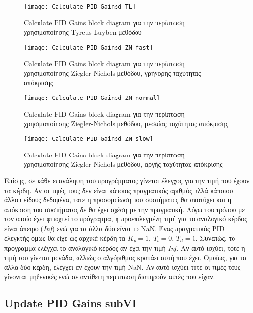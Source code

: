 \begin{figure}[h]
  \centering
  \texttt{[image: Calculate\_PID\_Gainsd\_TL]}
  \caption{Calculate PID Gains block diagram για την περίπτωση χρησιμοποίησης Tyreus-Luyben μεθόδου}
  \label{fig:Calculate_PID_Gainsd_TL}
\end{figure}

\begin{figure}[h!]
  \centering
  \texttt{[image: Calculate\_PID\_Gainsd\_ZN\_fast]}
  \caption{Calculate PID Gains block diagram για την περίπτωση χρησιμοποίησης Ziegler-Nichols μεθόδου, γρήγορης ταχύτητας απόκρισης}
  \label{fig:Calculate_PID_Gainsd_ZN_fast}
\end{figure}

\begin{figure}[h]
  \centering
  \texttt{[image: Calculate\_PID\_Gainsd\_ZN\_normal]}
  \caption{Calculate PID Gains block diagram για την περίπτωση χρησιμοποίησης Ziegler-Nichols μεθόδου, μεσαίας ταχύτητας απόκρισης}
  \label{fig:Calculate_PID_Gainsd_ZN_normal}
\end{figure}

\begin{figure}[h!]
  \centering
  \texttt{[image: Calculate\_PID\_Gainsd\_ZN\_slow]}
  \caption{Calculate PID Gains block diagram για την περίπτωση χρησιμοποίησης Ziegler-Nichols μεθόδου, αργής ταχύτητας απόκρισης}
  \label{fig:Calculate_PID_Gainsd_ZN_slow}
\end{figure}

Επίσης, σε κάθε επανάληψη του προγράμματος γίνεται έλεγχος για την τιμή που έχουν τα κέρδη. Αν οι τιμές τους δεν είναι κάποιος πραγματικός αριθμός αλλά κάποιου άλλου είδους δεδομένα, τότε η προσομοίωση του συστήματος θα αποτύχει και η απόκριση του συστήματος δε θα έχει σχέση με την πραγματική. Λόγω του τρόπου με τον οποίο έχει φτιαχτεί το πρόγραμμα, η προεπιλεγμένη τιμή για το αναλογικό κέρδος είναι άπειρο (\emph{Inf}) ενώ για τα άλλα δύο είναι το NaN. Ένας πραγματικός PID ελεγκτής όμως θα είχε ως αρχικά κέρδη τα $K_p = 1,\ T_i = 0,\ T_d = 0$. Συνεπώς, το πρόγραμμα ελέγχει το αναλογικό κέρδος αν έχει την τιμή \textit{Inf}. Αν αυτό ισχύει, τότε η τιμή του γίνεται μονάδα, αλλιώς ο αλγόριθμος κρατάει αυτή που έχει. Ομοίως, για τα άλλα δύο κέρδη, ελέγχει αν έχουν την τιμή NaN. Αν αυτό ισχύει τότε οι τιμές τους γίνονται μηδενικές ενώ σε αντίθετη περίπτωση διατηρούν αυτές που είχαν.

\subsection{Update PID Gains subVI}

